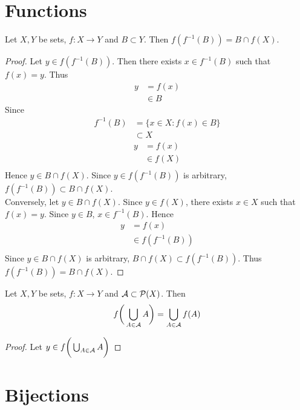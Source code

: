 \documentclass{book}
\begin{document}
	\section{Functions}
	
	\begin{ex}
		Let $X, Y$ be sets, $f:X \rightarrow Y$ and $B \subset Y$. Then $f(f^{-1}(B)) = B \cap f(X)$. 
	\end{ex}

	\begin{proof}
		Let $y \in f(f^{-1}(B))$. Then there exists $x \in f^{-1}(B)$ such that $f(x) = y$. Thus 
		\begin{align*}
			y
			& = f(x) \\
			& \in B
		\end{align*}
		Since 
		\begin{align*}
			f^{-1}(B) 
			& = \{x \in X: f(x) \in B\} \\
			& \subset X
		\end{align*}
		\begin{align*}
			y
			& = f(x) \\
			& \in f(X) \\
		\end{align*}
			Hence $y \in B \cap f(X)$. Since $y \in f(f^{-1}(B))$ is arbitrary, $f(f^{-1}(B)) \subset  B \cap f(X)$.\\
			Conversely, let $y \in B \cap f(X)$. Since $y \in f(X)$, there exists $x \in X$ such that $f(x) = y$. Since $y \in B$, $x \in f^{-1}(B)$. Hence 
			\begin{align*}
				y
				& = f(x) \\
				& \in f(f^{-1}(B)) \\
			\end{align*}
			Since $y \in B \cap f(X)$ is arbitrary, $B \cap f(X) \subset f(f^{-1}(B))$. Thus $f(f^{-1}(B)) =  B \cap f(X)$.
		\end{proof}
	
		\begin{ex}
			Let $X, Y$ be sets, $f:X \rightarrow Y$ and $\mathcal{A} \subset \mathcal{P}(X)$. Then 
			$$f\bigg( \bigcup_{A \in \mathcal{A}} A\bigg) = \bigcup_{A \in \mathcal{A}} f(A)$$ 
		\end{ex}
	
		\begin{proof}
			Let $y \in f\bigg( \bigcup_{A \in \mathcal{A}} A \bigg)$
		\end{proof}
	
	\section{Bijections}
	
\end{document}
